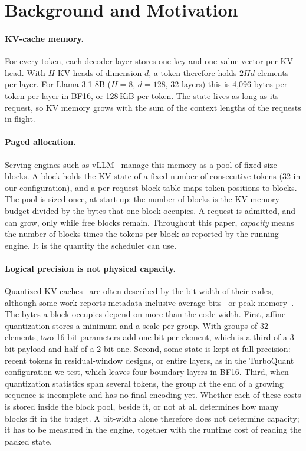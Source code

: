 \documentclass{article}
\begin{document}
\section{Background and Motivation}
\label{sec:background}

\paragraph{KV-cache memory.}
For every token, each decoder layer stores one key and one value vector per KV head. With $H$ KV heads
of dimension $d$, a token therefore holds $2Hd$ elements per layer. For Llama-3.1-8B ($H=8$, $d=128$,
32 layers) this is 4,096 bytes per token per layer in BF16, or 128\,KiB per token. The state lives as
long as its request, so KV memory grows with the sum of the context lengths of the requests in flight.

\paragraph{Paged allocation.}
Serving engines such as vLLM~\citep{kwon2023vllm} manage this memory as a pool of fixed-size blocks. A block holds the
KV state of a fixed number of consecutive tokens (32 in our configuration), and a per-request block
table maps token positions to blocks. The pool is sized once, at start-up: the number of blocks is the
KV memory budget divided by the bytes that one block occupies. A request is admitted, and can grow,
only while free blocks remain. Throughout this paper, \emph{capacity} means the number of blocks times
the tokens per block as reported by the running engine. It is the quantity the scheduler can use.

\paragraph{Logical precision is not physical capacity.}
Quantized KV caches~\citep{liu2024kivi,hooper2024kvquant,zandieh2025turboquant} are often described by
the bit-width of their codes, although some work reports metadata-inclusive average
bits~\citep{duanmu2024skvq} or peak memory~\citep{liu2024kivi}. The bytes a block occupies depend on more
than the code width. First, affine quantization stores a minimum and a
scale per group. With groups of 32 elements, two 16-bit parameters add one bit per element, which is a
third of a 3-bit payload and half of a 2-bit one. Second, some state is kept at full precision: recent
tokens in residual-window designs, or entire layers, as in the TurboQuant configuration we test, which
leaves four boundary layers in BF16. Third, when quantization statistics span several tokens, the group
at the end of a growing sequence is incomplete and has no final encoding yet. Whether each of these
costs is stored inside the block pool, beside it, or not at all determines how many blocks fit in the
budget. A bit-width alone therefore does not determine capacity; it has to be measured in the engine,
together with the runtime cost of reading the packed state.
\end{document}
